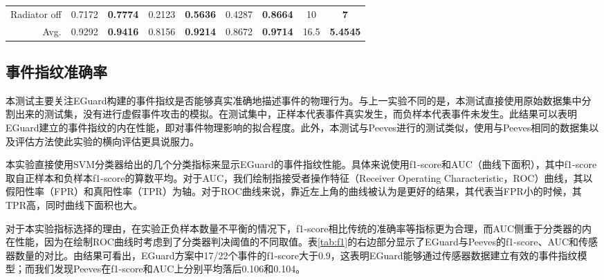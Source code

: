 \begin{table*}
\begin{center}
{\begin{tabular}{r|cc|cc|cc|cc}
				Radiator off                                             & 0.7172                              & \textbf{0.7774}                     & 0.2123                              & \textbf{0.5636}                     & 0.4287                              & \textbf{0.8664}                     & 10                                  & \textbf{7}                          \\
				Avg.                                                     & 0.9292                              & \textbf{0.9416}                     & 0.8156                              & \textbf{0.9214}                     & 0.8672                              & \textbf{0.9714}                     & 16.5                                & \textbf{5.4545}                     \\
				\bottomrule             
			\end{tabular}
			}
		\label{tab:f1}
	\end{center}
\end{table*}

\subsection{事件指纹准确率}
\label{subsec:clf performance}

本测试主要关注EGuard构建的事件指纹是否能够真实准确地描述事件的物理行为。与上一实验不同的是，本测试直接使用原始数据集中分割出来的测试集，没有进行虚假事件攻击的模拟。在测试集中，正样本代表事件真实发生，而负样本代表事件未发生。此结果可以表明EGuard建立的事件指纹的内在性能，即对事件物理影响的拟合程度。此外，本测试与Peeves进行的测试类似，使用与Peeves相同的数据集以及评估方法使此实验的横向评估更具说服力。

本实验直接使用SVM分类器给出的几个分类指标来显示EGuard的事件指纹性能。具体来说使用f1-score和AUC（曲线下面积），其中f1-score取自正样本和负样本f1-score的算数平均。对于AUC，我们绘制指接受者操作特征（Receiver Operating Characteristic，ROC）曲线，其以假阳性率（FPR）和真阳性率（TPR）为轴。对于ROC曲线来说，靠近左上角的曲线被认为是更好的结果，其代表当FPR小的时候，其TPR高，同时曲线下面积也大。

对于本实验指标选择的理由，在实验正负样本数量不平衡的情况下，f1-score相比传统的准确率等指标更为合理，而AUC侧重于分类器的内在性能，因为在绘制ROC曲线时考虑到了分类器判决阈值的不同取值。表\ref{tab:f1}的右边部分显示了EGuard与Peeves的f1-score、AUC和传感器数量的对比。由结果可看出，EGuard方案中17/22个事件的f1-score大于0.9，这表明EGuard能够通过传感器数据建立有效的事件指纹模型；而我们发现Peeves在f1-score和AUC上分别平均落后0.106和0.104。

